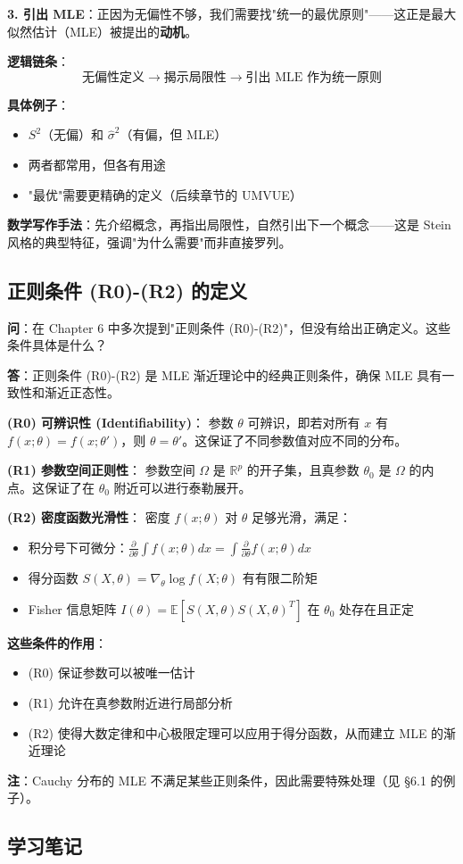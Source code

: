 \textbf{3. 引出 MLE}：正因为无偏性不够，我们需要找"统一的最优原则"——这正是最大似然估计（MLE）被提出的\textbf{动机}。

\textbf{逻辑链条}：
\[
\text{无偏性定义} \rightarrow \text{揭示局限性} \rightarrow \text{引出 MLE 作为统一原则}
\]

\textbf{具体例子}：
\begin{itemize}
\item $S^2$（无偏）和 $\widehat{\sigma}^2$（有偏，但 MLE）
\item 两者都常用，但各有用途
\item "最优"需要更精确的定义（后续章节的 UMVUE）
\end{itemize}

\textbf{数学写作手法}：先介绍概念，再指出局限性，自然引出下一个概念——这是 Stein 风格的典型特征，强调"为什么需要"而非直接罗列。

\subsection{正则条件 (R0)-(R2) 的定义}\label{sec:qa-regularity-conditions}

\textbf{问}：在 Chapter 6 中多次提到"正则条件 (R0)-(R2)"，但没有给出正确定义。这些条件具体是什么？

\textbf{答}：正则条件 (R0)-(R2) 是 MLE 渐近理论中的经典正则条件，确保 MLE 具有一致性和渐近正态性。

\textbf{(R0) 可辨识性 (Identifiability)}：
参数 $\theta$ 可辨识，即若对所有 $x$ 有 $f(x;\theta) = f(x;\theta')$，则 $\theta = \theta'$。这保证了不同参数值对应不同的分布。

\textbf{(R1) 参数空间正则性}：
参数空间 $\Omega$ 是 $\mathbb{R}^p$ 的开子集，且真参数 $\theta_0$ 是 $\Omega$ 的内点。这保证了在 $\theta_0$ 附近可以进行泰勒展开。

\textbf{(R2) 密度函数光滑性}：
密度 $f(x;\theta)$ 对 $\theta$ 足够光滑，满足：
\begin{itemize}
\item 积分号下可微分：$\frac{\partial}{\partial\theta}\int f(x;\theta)dx = \int \frac{\partial}{\partial\theta}f(x;\theta)dx$
\item 得分函数 $S(X,\theta) = \nabla_\theta \log f(X;\theta)$ 有有限二阶矩
\item Fisher 信息矩阵 $I(\theta) = \mathbb{E}[S(X,\theta) S(X,\theta)^T]$ 在 $\theta_0$ 处存在且正定
\end{itemize}

\textbf{这些条件的作用}：
\begin{itemize}
\item (R0) 保证参数可以被唯一估计
\item (R1) 允许在真参数附近进行局部分析
\item (R2) 使得大数定律和中心极限定理可以应用于得分函数，从而建立 MLE 的渐近理论
\end{itemize}

\textbf{注}：Cauchy 分布的 MLE 不满足某些正则条件，因此需要特殊处理（见 \S 6.1 的例子）。

\subsection*{学习笔记}
